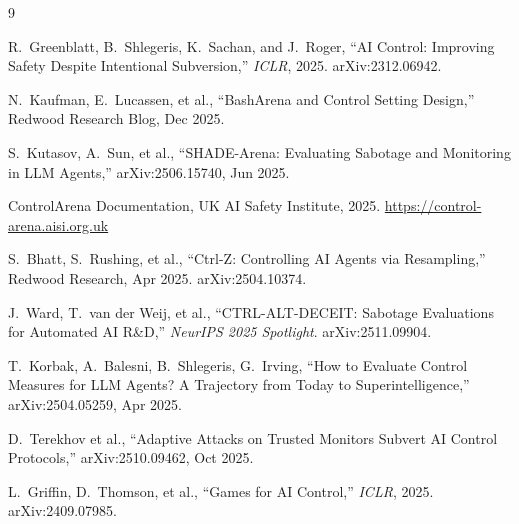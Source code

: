 \documentclass[10pt,twocolumn]{article}
\begin{document}
\begin{thebibliography}{9}

R.~Greenblatt, B.~Shlegeris, K.~Sachan, and J.~Roger,
``AI Control: Improving Safety Despite Intentional Subversion,''
\emph{ICLR}, 2025. arXiv:2312.06942.

N.~Kaufman, E.~Lucassen, et al.,
``BashArena and Control Setting Design,''
Redwood Research Blog, Dec 2025.

S.~Kutasov, A.~Sun, et al.,
``SHADE-Arena: Evaluating Sabotage and Monitoring in LLM Agents,''
arXiv:2506.15740, Jun 2025.

ControlArena Documentation,
UK AI Safety Institute, 2025.
\url{https://control-arena.aisi.org.uk}

S.~Bhatt, S.~Rushing, et al.,
``Ctrl-Z: Controlling AI Agents via Resampling,''
Redwood Research, Apr 2025. arXiv:2504.10374.

J.~Ward, T.~van der Weij, et al.,
``CTRL-ALT-DECEIT: Sabotage Evaluations for Automated AI R\&D,''
\emph{NeurIPS 2025 Spotlight}. arXiv:2511.09904.

T.~Korbak, A.~Balesni, B.~Shlegeris, G.~Irving,
``How to Evaluate Control Measures for LLM Agents? A Trajectory from Today to Superintelligence,''
arXiv:2504.05259, Apr 2025.

D.~Terekhov et al.,
``Adaptive Attacks on Trusted Monitors Subvert AI Control Protocols,''
arXiv:2510.09462, Oct 2025.

L.~Griffin, D.~Thomson, et al.,
``Games for AI Control,''
\emph{ICLR}, 2025. arXiv:2409.07985.

\end{thebibliography}
\end{document}
